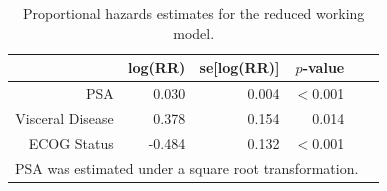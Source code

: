 \documentclass[12pt]{article}
\begin{document}
\begin{table}[ht]
\centering
 \caption{Proportional hazards estimates for the reduced working model.}  
\begin{tabular}{rrrrrr} 
  \hline
 & log(RR)  & se[log(RR)] & $p$-value \\
  \hline
PSA & 0.030 &   0.004 & $<$0.001 \\ 
Visceral Disease & 0.378 & 0.154 & 0.014 \\ 
  ECOG Status  & -0.484 &  0.132   &$<$0.001 \\ 
   \hline
      \multicolumn{5}{l}{PSA was estimated under a square root transformation.} \\
\end{tabular} \label{ProstateReduced}
\end{table}

 



\clearpage
\end{document}
